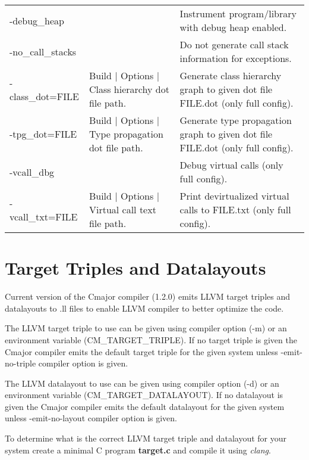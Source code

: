 \documentclass[oneside, a4paper, 11pt]{article}
\begin{document}
\begin{table}[htb]
\begin{tabular}{lp{5cm}p{5cm}}
-debug\_heap & & Instrument program/library with debug heap enabled.\\
-no\_call\_stacks & & Do not generate call stack information for exceptions.\\
-class\_dot=FILE & Build $|$ Options $|$ Class hierarchy dot file path. & Generate class hierarchy graph to given dot file FILE.dot (only full config).\\
-tpg\_dot=FILE & Build $|$ Options $|$ Type propagation dot file path. & Generate type propagation graph to given dot file FILE.dot (only full config).\\
-vcall\_dbg & & Debug virtual calls (only full config).\\
-vcall\_txt=FILE & Build $|$ Options $|$ Virtual call text file path. & Print devirtualized virtual calls to FILE.txt (only full config).\\
\end{tabular}
\end{table}

\section{Target Triples and Datalayouts}

Current version of the Cmajor compiler (1.2.0) emits LLVM target triples and datalayouts to .ll files
to enable LLVM compiler to better optimize the code.

The LLVM target triple to use can be given using compiler option (-m) or an environment variable (CM\_TARGET\_TRIPLE).
If no target triple is given the Cmajor compiler emits the default target triple for the given system unless
-emit-no-triple compiler option is given.

The LLVM datalayout to use can be given using compiler option (-d) or an environment variable (CM\_TARGET\_DATALAYOUT).
If no datalayout is given the Cmajor compiler emits the default datalayout for the given system unless
-emit-no-layout compiler option is given.

To determine what is the correct LLVM target triple and datalayout for your system
create a minimal C program \textbf{target.c} and compile it using \emph{clang}.
\end{document}
